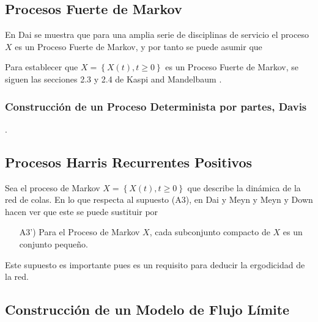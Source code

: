 \subsection{Procesos Fuerte de Markov}
En Dai \cite{Dai} se muestra que para una amplia serie de disciplinas
de servicio el proceso $X$ es un Proceso Fuerte de
Markov, y por tanto se puede asumir que


Para establecer que $X=\left\{X\left(t\right),t\geq0\right\}$ es
un Proceso Fuerte de Markov, se siguen las secciones 2.3 y 2.4 de Kaspi and Mandelbaum \cite{KaspiMandelbaum}. \\

\subsubsection{Construcci\'on de un Proceso Determinista por partes, Davis
\cite{Davis}}.

\subsection{Procesos Harris Recurrentes Positivos}
Sea el proceso de Markov $X=\left\{X\left(t\right),t\geq0\right\}$
que describe la din\'amica de la red de colas. En lo que respecta
al supuesto (A3), en Dai y Meyn \cite{DaiSean} y Meyn y Down
\cite{MeynDown} hacen ver que este se puede sustituir por

\begin{itemize}
\item[A3')] Para el Proceso de Markov $X$, cada subconjunto
compacto de $X$ es un conjunto peque\~no.
\end{itemize}

Este supuesto es importante pues es un requisito para deducir la ergodicidad de la red.

\subsection{Construcci\'on de un Modelo de Flujo L\'imite}

